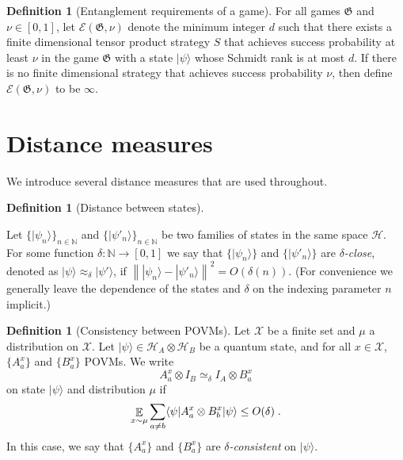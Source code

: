 \documentclass{book}
\theoremstyle{plain}
\theoremstyle{definition}
\newtheorem{definition}[subsection]{Definition}
\theoremstyle{remark}
\numberwithin{equation}{subsection}
\newcommand{\cal}[1]{\mathcal{#1}}
\newcommand{\mH}{\mathcal{H}}
\newcommand{\mX}{\mathcal{X}}
\newcommand{\E}{\mathop{\mathbb{E}}\displaylimits} %
\newcommand{\N}{\mathbb{N}}
\newcommand{\norm}[1]{\left\| {#1} \right\|}
\newcommand{\ket}[1]{|#1\rangle}
\newcommand{\bra}[1]{\langle#1|}
\newcommand{\game}{\mathfrak{G}}
\newcommand{\strategy}{{S}}
\newcommand{\Ent}{\mathcal{E}}
\newcommand{\alice}{A}
\newcommand{\bob}{B}
\begin{document}
\begin{definition}[Entanglement requirements of a game]
  \label{def:ent}
	For all games $\game$ and $\nu \in [0, 1]$, let $\Ent(\game, \nu)$ denote the
  minimum integer $d$ such that there exists a finite dimensional tensor product
  strategy $\strategy$ that achieves success probability at least $\nu$ in the
  game $\game$ with a state $\ket{\psi}$ whose Schmidt rank is at most $d$.
  If there is no finite dimensional strategy that achieves success probability
  $\nu$, then define $\Ent(\game, \nu)$ to be $\infty$.
\end{definition}

\section{Distance measures}

We introduce several distance measures that are used throughout.

\begin{definition}[Distance between states]
  \label{def:state-distance}

	Let $\{\ket{\psi_n}\}_{n\in \N}$ and $\{\ket{\psi'_n}\}_{n\in \N}$ be two
  families of states in the same space $\mH$.
  For some function $\delta : \N \to [0,1]$ we say that $\{ \ket{\psi_n} \}$ and
  $\{ \ket{\psi'_n} \}$ are \emph{$\delta$-close}, denoted as $\ket{\psi}
  \approx_\delta \ket{\psi'}$, if $ \norm{\ket{\psi_n} - \ket{\psi'_n}}^2 =
  O(\delta(n))$.
  (For convenience we generally leave the dependence of the states and $\delta$
  on the indexing parameter $n$ implicit.)
\end{definition}

\begin{definition}[Consistency between POVMs]
  \label{def:consistency}
	Let $\mX$ be a finite set and $\mu$ a distribution on $\mX$.
  Let $\ket{\psi} \in \cal{H}_A \otimes \cal{H}_B$ be a quantum state, and for
  all $x\in \mX$, $\{A^x_a\}$ and $\{B^x_a\}$ POVMs.
  We write
  \begin{equation*}
    A^x_a \otimes I_\bob \simeq_\delta I_\alice \otimes B^x_a
  \end{equation*}
  on state $\ket{\psi}$ and distribution $\mu$ if
  \begin{equation*}
    \E_{x\sim \mu} \sum_{a\ne b} \bra{\psi} A^x_a \otimes B^x_b \ket{\psi}
    \leq O(\delta)\;.
  \end{equation*}
  In this case, we say that $\{A^x_a\}$ and $\{B^x_a\}$ are
  \emph{$\delta$-consistent} on $\ket{\psi}$.
\end{definition}
\end{document}
